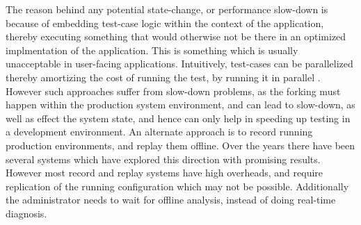 The reason behind any potential state-change, or performance slow-down is because of embedding test-case logic within the context of the application, thereby executing something that would otherwise not be there in an optimized implmentation of the application.
This is something which is usually unacceptable in user-facing applications.
Intuitively, test-cases can be parallelized thereby amortizing the cost of running the test, by running it in parallel \cite{invite}.
However such approaches suffer from slow-down problems, as the forking must happen within the production system environment, and can lead to slow-down, as well as effect the system state, and hence can only help in speeding up testing in a development environment.
An alternate approach is to record running production environments, and replay them offline.
Over the years there have been several systems which have explored this direction with promising results.
However most record and replay systems have high overheads, and require replication of the running configuration which may not be possible. 
Additionally the administrator needs to wait for offline analysis, instead of doing real-time diagnosis.

